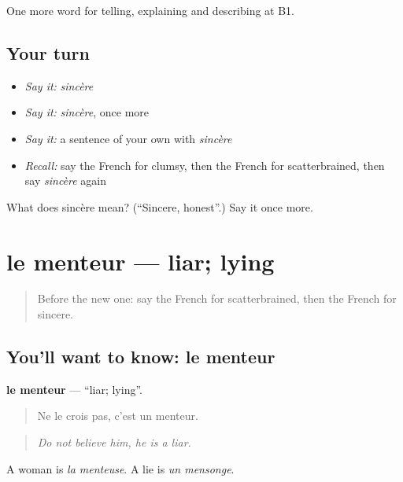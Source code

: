 \begin{grammarlens}[title={What you've built}]
One more word for telling, explaining and describing at B1.
\end{grammarlens}

\subsection*{Your turn}
\begin{itemize}
\raggedright
  \item \emph{Say it:} \emph{sincère}
  \item \emph{Say it:} \emph{sincère}, once more
  \item \emph{Say it:} a sentence of your own with \emph{sincère}
  \item \emph{Recall:} say the French for clumsy, then the French for scatterbrained, then say \emph{sincère} again
\end{itemize}

\begin{tcolorbox}[breakable,colback=teal!4,colframe=teal!35!black,title={Before you move on}]
What does sincère mean? (\textquotedblleft{}Sincere, honest\textquotedblright{}.) Say it once more.
\end{tcolorbox}
\section[le menteur]{le menteur — liar; lying}

\label{lesson:FR-C468-menteur}



\begin{quote}
Before the new one: say the French for scatterbrained, then the French for sincere.
\end{quote}

\subsection*{You'll want to know: le menteur}
\textbf{le menteur} — \textquotedblleft{}liar; lying\textquotedblright{}.

\begin{quote}
Ne le crois pas, c'est un menteur.
\end{quote}

\begin{quote}
\emph{Do not believe him, he is a liar.}
\end{quote}

A woman is \emph{la menteuse}. A lie is \emph{un mensonge}.

